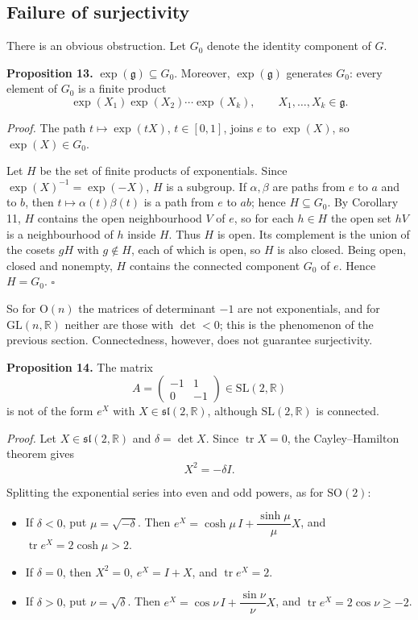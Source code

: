 \documentclass[11pt]{article}
\begin{document}
\subsection{Failure of surjectivity}

There is an obvious obstruction. Let $G_0$ denote the identity component of $G$.

\textbf{Proposition 13.} $\exp(\mathfrak{g}) \subseteq G_0$. Moreover, $\exp(\mathfrak{g})$ generates $G_0$: every element of $G_0$ is a finite product
\[
\exp(X_1) \exp(X_2) \cdots \exp(X_k), \qquad X_1, \dots, X_k \in \mathfrak{g}.
\]

\emph{Proof.} The path $t \mapsto \exp(tX)$, $t \in [0, 1]$, joins $e$ to $\exp(X)$, so $\exp(X) \in G_0$.

Let $H$ be the set of finite products of exponentials. Since $\exp(X)^{-1} = \exp(-X)$, $H$ is a subgroup. If $\alpha, \beta$ are paths from $e$ to $a$ and to $b$, then $t \mapsto \alpha(t)\beta(t)$ is a path from $e$ to $ab$; hence $H \subseteq G_0$. By Corollary 11, $H$ contains the open neighbourhood $V$ of $e$, so for each $h \in H$ the open set $hV$ is a neighbourhood of $h$ inside $H$. Thus $H$ is open. Its complement is the union of the cosets $gH$ with $g \notin H$, each of which is open, so $H$ is also closed. Being open, closed and nonempty, $H$ contains the connected component $G_0$ of $e$. Hence $H = G_0$. $\square$

So for $\mathrm{O}(n)$ the matrices of determinant $-1$ are not exponentials, and for $\mathrm{GL}(n, \mathbb{R})$ neither are those with $\det < 0$; this is the phenomenon of the previous section. Connectedness, however, does not guarantee surjectivity.

\textbf{Proposition 14.} The matrix
\[
A = \begin{pmatrix} -1 & 1 \\ 0 & -1 \end{pmatrix} \in \mathrm{SL}(2, \mathbb{R})
\]
is not of the form $e^X$ with $X \in \mathfrak{sl}(2, \mathbb{R})$, although $\mathrm{SL}(2, \mathbb{R})$ is connected.

\emph{Proof.} Let $X \in \mathfrak{sl}(2, \mathbb{R})$ and $\delta = \det X$. Since $\operatorname{tr} X = 0$, the Cayley–Hamilton theorem gives
\[
X^2 = -\delta I.
\]

Splitting the exponential series into even and odd powers, as for $\mathrm{SO}(2)$:

\begin{itemize}
  \item If $\delta < 0$, put $\mu = \sqrt{-\delta}$. Then $e^X = \cosh\mu\, I + \dfrac{\sinh \mu}{\mu} X$, and $\operatorname{tr} e^X = 2\cosh \mu > 2$.
  \item If $\delta = 0$, then $X^2 = 0$, $e^X = I + X$, and $\operatorname{tr} e^X = 2$.
  \item If $\delta > 0$, put $\nu = \sqrt{\delta}$. Then $e^X = \cos\nu\, I + \dfrac{\sin \nu}{\nu} X$, and $\operatorname{tr} e^X = 2\cos \nu \ge -2$.
\end{itemize}
\end{document}
